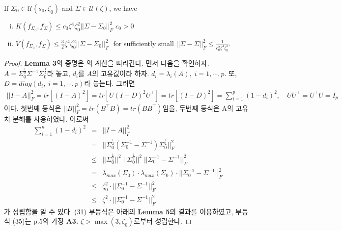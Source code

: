   \begin{lemma} If $\Sigma_0 \in \mathcal{U}(s_0, \zeta_0)$ and $\Sigma \in \mathcal{U}(\zeta)$, we have
    \begin{enumerate}[(i)]
      \item $K(f_{\Sigma_0}, f_\Sigma) \leq c_0 \zeta^4 \zeta_0^2 || \Sigma - \Sigma_0 ||_F^2$ \;  $c_0 > 0$
      \item $V(f_{\Sigma_0}, f_\Sigma) \leq \frac{3}{2} \zeta^4 \zeta_0^2 || \Sigma - \Sigma_0 ||_F^2 \; $ for sufficiently small $|| \Sigma - \Sigma||_F^2 \leq \frac{1}{c_0^2 \zeta^4 \zeta_0^2}.$
    \end{enumerate}    
  \end{lemma}

  \begin{proof}
  \textbf{Lemma 3}의 증명은 \cite{banerjee2015bayesian}의 계산을 따라간다. 먼저 다음을 확인하자. $A = \Sigma_0^{\frac{1}{2}} \Sigma^{-1} \Sigma_0^{\frac{1}{2}}$라 놓고, $d_i$를 $A$의 고유값이라 하자. $d_i = \lambda_i(A), \; i=1,\cdots,p.$ 또, $D = diag(d_i, \; i=1,\cdots,p)$라 놓는다. 그러면
  \begin{align*}
    ||I - A||_F^2 = tr \left[ (I - A)^2 \right] = tr \left[ U(I - D)^2 U^\top \right] = tr \left[ (I - D)^2 \right] = \sum_{i=1}^{p} (1 - d_i)^2, \quad UU^\top = U^\top U = I_p
  \end{align*}
  이다. 첫번째 등식은 $|| B ||_F^2 = tr \left( B^\top B \right) = tr \left( B B^\top \right)$임을, 두번째 등식은 A의 고유치 분해를 사용하였다. 이로써
  \begin{eqnarray}
      \sum_{i=1}^n (1 - d_i)^2 &=&|| I - A ||_F^2  \\
      &=& || \Sigma_0^{\frac{1}{2}} ( \Sigma_0^{-1} - \Sigma^{-1} ) \Sigma_0^{\frac{1}{2}} ||_F^2 \\
      &\leq& || \Sigma_0^{\frac{1}{2}} ||^2 \; || \Sigma_0^{\frac{1}{2}} ||^2 \; || \Sigma_0^{-1} - \Sigma^{-1} ||_F^2  \\
      &=& \lambda_{max}(\Sigma_0) \cdot \lambda_{max}(\Sigma_0) \cdot || \Sigma_0^{-1} - \Sigma^{-1} ||_F^2 \\
      &\leq& \zeta_0^2 \cdot || \Sigma_0^{-1} - \Sigma^{-1} ||_F^2  \\
      &\leq& \zeta^2 \cdot || \Sigma_0^{-1} - \Sigma^{-1} ||_F^2
    \end{eqnarray}
    가 성립함을 알 수 있다. (31) 부등식은 아래의 \textbf{Lemma 5}의 결과를 이용하였고, 부등식 (35)는 \cite{lee2022beta} p.5의 가정 \textbf{A3.} $\zeta > \max{(3, \zeta_0)}$로부터 성립한다.

\end{proof}
